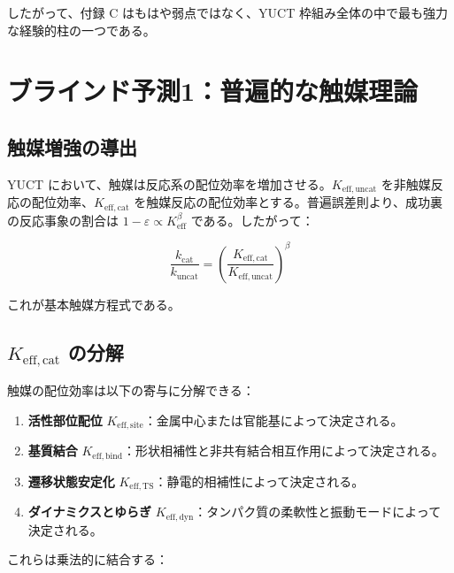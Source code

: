 \documentclass[11pt,a4paper]{article}
\newcommand{\Keff}{K_{\mathrm{eff}}}
\newcommand{\eps}{\varepsilon}
\begin{document}
	したがって、付録 C はもはや弱点ではなく、YUCT 枠組み全体の中で最も強力な経験的柱の一つである。
	
	\section{ブラインド予測1：普遍的な触媒理論}
	\label{sec:catalysis}
	
	\subsection{触媒増強の導出}
	
	YUCT において、触媒は反応系の配位効率を増加させる。\(K_{\mathrm{eff},\text{uncat}}\) を非触媒反応の配位効率、\(K_{\mathrm{eff},\text{cat}}\) を触媒反応の配位効率とする。普遍誤差則より、成功裏の反応事象の割合は $1 - \eps \propto \Keff^{\beta}$ である。したがって：
	
	\begin{equation}
		\frac{k_{\text{cat}}}{k_{\text{uncat}}} = \left(\frac{K_{\mathrm{eff},\text{cat}}}{K_{\mathrm{eff},\text{uncat}}}\right)^{\beta}
		\label{eq:cat-enhancement}
	\end{equation}
	
	これが基本触媒方程式である。
	
	\subsection{\(K_{\mathrm{eff},\text{cat}}\) の分解}
	
	触媒の配位効率は以下の寄与に分解できる：
	\begin{enumerate}
		\item \textbf{活性部位配位} \(K_{\mathrm{eff},\text{site}}\)：金属中心または官能基によって決定される。
		\item \textbf{基質結合} \(K_{\mathrm{eff},\text{bind}}\)：形状相補性と非共有結合相互作用によって決定される。
		\item \textbf{遷移状態安定化} \(K_{\mathrm{eff},\text{TS}}\)：静電的相補性によって決定される。
		\item \textbf{ダイナミクスとゆらぎ} \(K_{\mathrm{eff},\text{dyn}}\)：タンパク質の柔軟性と振動モードによって決定される。
	\end{enumerate}
	
	これらは乗法的に結合する：
	
\end{document}
